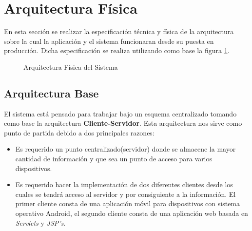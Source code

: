 \section{Arquitectura Física}

En esta sección se realizar la especificación técnica y física de la arquitectura sobre la cual la aplicación y el sistema funcionaran desde su puesta en producción. Dicha especificación se realiza utilizando como base la figura \ref{fig:arqFisica}.

\begin{figure}[hbtp!]
	\begin{center}
		\caption{Arquitectura Física del Sistema}
		\label{fig:arqFisica}
	\end{center}
\end{figure}

\subsection{Arquitectura Base}
El sistema está pensado para trabajar bajo un esquema centralizado tomando como base la arquitectura \textbf{Cliente-Servidor}. Esta arquitectura nos sirve como punto de partida debido a dos principales razones:
	\begin{itemize}
		\item Es requerido un punto centralizado(servidor) donde se almacene la mayor cantidad de información y que sea un punto de acceso para varios dispositivos.
		\item Es requerido hacer la implementación de dos diferentes clientes desde los cuales se tendrá acceso al servidor y por consiguiente a la información. El primer cliente consta de una aplicación móvil para dispositivos con sistema operativo Android, el segundo cliente consta de una aplicación web basada en \textit{Servlets} y \textit{JSP's}. 
	\end{itemize}

